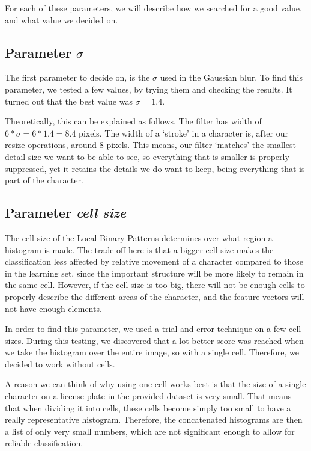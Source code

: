 \documentclass[a4paper]{article}
\begin{document}
For each of these parameters, we will describe how we searched for a good
value, and what value we decided on.

\subsection{Parameter $\sigma$}

The first parameter to decide on, is the $\sigma$ used in the Gaussian blur. To
find this parameter, we tested a few values, by trying them and checking the
results. It turned out that the best value was $\sigma = 1.4$.

Theoretically, this can be explained as follows. The filter has width of
$6 * \sigma = 6 * 1.4 = 8.4$ pixels. The width of a `stroke' in a character is,
after our resize operations, around 8 pixels. This means, our filter `matches'
the smallest detail size we want to be able to see, so everything that is
smaller is properly suppressed, yet it retains the details we do want to keep,
being everything that is part of the character.

\subsection{Parameter \emph{cell size}}

The cell size of the Local Binary Patterns determines over what region a
histogram is made. The trade-off here is that a bigger cell size makes the
classification less affected by relative movement of a character compared to
those in the learning set, since the important structure will be more likely to
remain in the same cell. However, if the cell size is too big, there will not
be enough cells to properly describe the different areas of the character, and
the feature vectors will not have enough elements.

In order to find this parameter, we used a trial-and-error technique on a few
cell sizes. During this testing, we discovered that a lot better score was
reached when we take the histogram over the entire image, so with a single
cell. Therefore, we decided to work without cells.

A reason we can think of why using one cell works best is that the size of a
single character on a license plate in the provided dataset is very small.
That means that when dividing it into cells, these cells become simply too
small to have a really representative histogram. Therefore, the
concatenated histograms are then a list of only very small numbers, which
are not significant enough to allow for reliable classification.
\end{document}

